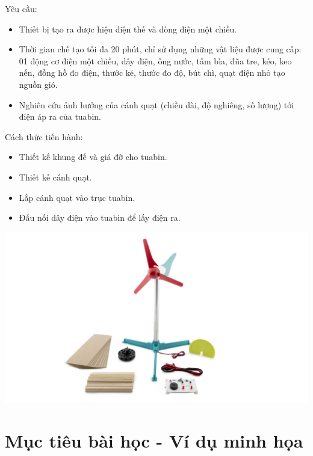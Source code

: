 \begin{minipage}{0.6\textwidth}
	Yêu cầu:
	\begin{itemize}
		\item Thiết bị tạo ra được hiệu điện thế và dòng điện một chiều.
		\item Thời gian chế tạo tối đa 20 phút, chỉ sử dụng những vật liệu được cung cấp: 01 động cơ điện một chiều, dây điện, ống nước, tấm bìa, đũa tre, kéo, keo nến, đồng hồ đo điện, thước kẻ, thước đo độ, bút chì, quạt điện nhỏ tạo nguồn gió.
		\item Nghiên cứu ảnh hưởng của cánh quạt (chiều dài, độ nghiêng, số lượng) tới điện áp ra của tuabin.
	\end{itemize}
	
	Cách thức tiến hành:
	\begin{itemize}
		\item Thiết kế khung đế và giá đỡ cho tuabin.
		\item Thiết kế cánh quạt.
		\item Lắp cánh quạt vào trục tuabin.
		\item Đấu nối dây điện vào tuabin để lấy điện ra.
	\end{itemize}
\end{minipage}
\begin{minipage}{0.4\textwidth}
	\begin{center}
		\includegraphics[width=\textwidth]{../figs/G10-036-3}
	\end{center}
\end{minipage}

\section{Mục tiêu bài học - Ví dụ minh họa}

